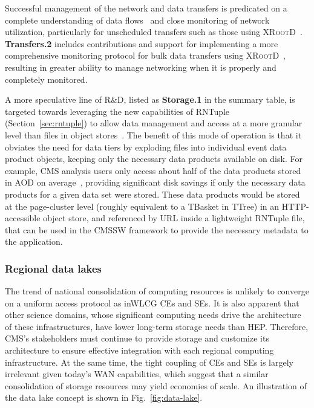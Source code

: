Successful management of the network and data transfers is predicated on a complete understanding of data flows~\cite{network-flows} and close monitoring of network utilization, particularly for unscheduled transfers such as those using \textsc{XRootD}~\cite{Garrido:2024bpi}. \textbf{Transfers.2} includes contributions and support for implementing a more comprehensive monitoring protocol for bulk data transfers using \textsc{XRootD}~\cite{Garrido:2024bpi}, resulting in greater ability to manage networking when it is properly and completely monitored.

A more speculative line of R\&D, listed as \textbf{Storage.1} in the summary table, is targeted towards leveraging the new capabilities of RNTuple (Section~\ref{sec:rntuple}) to allow data management and access at a more granular level than files in object stores~\cite{Smith:2023mrq}. The benefit of this mode of operation is that it obviates the need for data tiers by exploding files into individual event data product objects, keeping only the necessary data products available on disk. For example, CMS analysis users only access about half of the data products stored in \gls{AOD} on average~\cite{ncsmith-CHEP24}, providing significant disk savings if only the necessary data products for a given data set were stored. These data products would be stored at the page-cluster level (roughly equivalent to a TBasket in TTree) in an \gls{HTTP}-accessible object store, and referenced by \gls{URL} inside a lightweight RNTuple file, that can be used in the \gls{CMSSW} framework to provide the necessary metadata to the application.

\subsubsection{Regional data lakes}

The trend of national consolidation of computing resources is unlikely to converge on a uniform access protocol as in\gls{WLCG} CEs and SEs. It is also apparent that other science domains, whose significant computing needs drive the architecture of these infrastructures, have lower long-term storage needs than \gls{HEP}. Therefore, CMS's stakeholders must continue to provide storage and customize its architecture to ensure effective integration with each regional computing infrastructure. At the same time, the tight coupling of CEs and SEs is largely irrelevant given today’s \gls{WAN} capabilities, which suggest that a similar consolidation of storage resources may yield economies of scale. 
An illustration of the data lake concept is shown in Fig.~\ref{fig:data-lake}.

